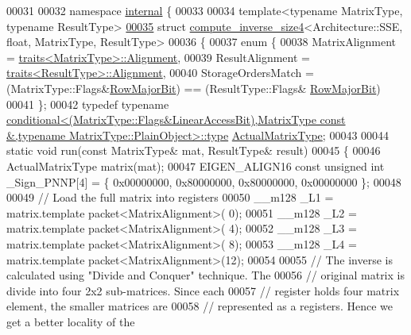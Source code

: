 \begin{DoxyCode}
00031 
00032 \textcolor{keyword}{namespace }\hyperlink{namespaceinternal}{internal} \{
00033 
00034 \textcolor{keyword}{template}<\textcolor{keyword}{typename} MatrixType, \textcolor{keyword}{typename} ResultType>
\hyperlink{struct_eigen_1_1internal_1_1compute__inverse__size4_3_01_architecture_1_1_s_s_e_00_01float_00_011c9f0f9df97321dfc4664a6d9e4a8f31}{00035} \textcolor{keyword}{struct }\hyperlink{struct_eigen_1_1internal_1_1compute__inverse__size4}{compute\_inverse\_size4}<Architecture::SSE, float, MatrixType, ResultType>
00036 \{
00037   \textcolor{keyword}{enum} \{
00038     MatrixAlignment     = \hyperlink{struct_eigen_1_1internal_1_1traits}{traits<MatrixType>::Alignment},
00039     ResultAlignment     = \hyperlink{struct_eigen_1_1internal_1_1traits}{traits<ResultType>::Alignment},
00040     StorageOrdersMatch  = (MatrixType::Flags&\hyperlink{group__flags_gae4f56c2a60bbe4bd2e44c5b19cbe8762}{RowMajorBit}) == (ResultType::Flags&
      \hyperlink{group__flags_gae4f56c2a60bbe4bd2e44c5b19cbe8762}{RowMajorBit})
00041   \};
00042   \textcolor{keyword}{typedef} \textcolor{keyword}{typename} 
      \hyperlink{class_eigen_1_1internal_1_1_tensor_lazy_evaluator_writable}{conditional<(MatrixType::Flags&LinearAccessBit),MatrixType const &,typename MatrixType::PlainObject>::type}
       \hyperlink{class_eigen_1_1internal_1_1_tensor_lazy_evaluator_writable}{ActualMatrixType};
00043   
00044   \textcolor{keyword}{static} \textcolor{keywordtype}{void} run(\textcolor{keyword}{const} MatrixType& mat, ResultType& result)
00045   \{
00046     ActualMatrixType matrix(mat);
00047     EIGEN\_ALIGN16 \textcolor{keyword}{const} \textcolor{keywordtype}{unsigned} \textcolor{keywordtype}{int} \_Sign\_PNNP[4] = \{ 0x00000000, 0x80000000, 0x80000000, 0x00000000 \};
00048 
00049     \textcolor{comment}{// Load the full matrix into registers}
00050     \_\_m128 \_L1 = matrix.template packet<MatrixAlignment>( 0);
00051     \_\_m128 \_L2 = matrix.template packet<MatrixAlignment>( 4);
00052     \_\_m128 \_L3 = matrix.template packet<MatrixAlignment>( 8);
00053     \_\_m128 \_L4 = matrix.template packet<MatrixAlignment>(12);
00054 
00055     \textcolor{comment}{// The inverse is calculated using "Divide and Conquer" technique. The}
00056     \textcolor{comment}{// original matrix is divide into four 2x2 sub-matrices. Since each}
00057     \textcolor{comment}{// register holds four matrix element, the smaller matrices are}
00058     \textcolor{comment}{// represented as a registers. Hence we get a better locality of the}

\end{DoxyCode}
